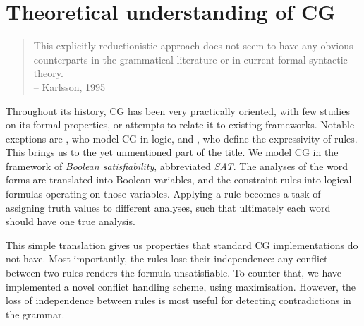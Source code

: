 

\section{Theoretical understanding of CG}

\begin{quote}
This explicitly reductionistic approach does not seem to have any obvious counterparts in the grammatical literature or in current formal syntactic theory. \\
-- Karlsson, 1995
\end{quote}

Throughout its history, CG has been very practically oriented, with 
few studies on its formal properties, or attempts to relate it to existing
frameworks.
Notable exeptions are \cite{lager_nivre01}, who model CG in logic, and 
\cite{tapanainen1999phd}, who define the expressivity of rules.
This brings us to the yet unmentioned part of the title.
We model CG in the framework of \emph{Boolean satisfiability}, abbreviated \emph{SAT}.
The analyses of the word forms are translated into Boolean variables, 
and the constraint rules into logical formulas operating on those variables.
Applying a rule becomes a task of assigning truth values to different analyses,
such that ultimately each word should have one true analysis.

This simple translation gives us properties that standard CG implementations do not have.
Most importantly, the rules lose their independence: any conflict between two rules renders the formula unsatisfiable. To counter that, we have implemented a novel conflict handling scheme, using maximisation. However, the loss of independence between rules is most useful for detecting contradictions in the grammar.



